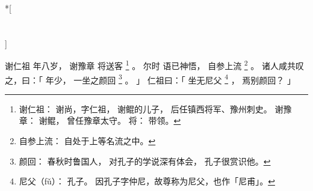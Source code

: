 
\switchcolumn[0]*[\section{}]

谢仁祖
年八岁，
谢豫章
将送客%
\footnote{%
    谢仁祖：
        谢尚，字仁祖，
        谢鲲的儿子，
        后任镇西将军、豫州刺史。
    谢豫章：
        谢鲲，
        曾任豫章太守。
    将：
        带领。
}%
。
尔时
语已神悟，
自参上流%
\footnote{%
    自参上流：
        自处于上等名流之中。
}%
。
诸人咸共叹之，曰：「
    年少，
    一坐之颜回%
    \footnote{%
        颜回：
            春秋时鲁国人，
            对孔子的学说深有体会，
            孔子很赏识他。
    }%
    。
」
仁祖曰：「
    坐无尼父%
    \footnote{%
        尼父（fǔ）：
            孔子。
            因孔子字仲尼，故尊称为尼父，也作「尼甫」。
    }%
    ，
    焉别颜回？
」

\switchcolumn



